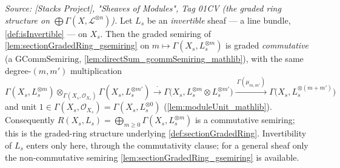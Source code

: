 \begin{lemma}\leanok
  \label{lem:sectionGradedRing_gcommSemiring}
  \textit{Source: [Stacks Project], "Sheaves of Modules", Tag 01CV (the graded
  ring structure on \(\bigoplus \Gamma(X,\mathcal{L}^{\otimes n})\)).}
  Let \(L_s\) be an \emph{invertible} sheaf --- a line bundle,
  \cref{def:isInvertible} --- on \(X_s\). Then the graded semiring of
  \cref{lem:sectionGradedRing_gsemiring} on
  \(m \mapsto \Gamma(X_s, L_s^{\otimes m})\) is graded \emph{commutative} (a
  \(\mathrm{GCommSemiring}\), \cref{lem:directSum_gcommSemiring_mathlib}), with the
  same degree-\((m,m')\) multiplication
  \[
    \Gamma(X_s, L_s^{\otimes m}) \otimes_{\Gamma(X_s,\mathcal{O}_{X_s})}
      \Gamma(X_s, L_s^{\otimes m'})
    \xrightarrow{\ \cdot\ }
    \Gamma\bigl(X_s, L_s^{\otimes m} \otimes L_s^{\otimes m'}\bigr)
    \xrightarrow{\ \Gamma(\mu_{m,m'})\ }
    \Gamma\bigl(X_s, L_s^{\otimes (m+m')}\bigr)
  \]
  and unit \(1 \in \Gamma(X_s, \mathcal{O}_{X_s}) = \Gamma(X_s, L_s^{\otimes 0})\)
  (\cref{lem:moduleUnit_mathlib}). Consequently
  \(R(X_s, L_s) = \bigoplus_{m \ge 0} \Gamma(X_s, L_s^{\otimes m})\) is a
  commutative semiring; this is the graded-ring structure underlying
  \cref{def:sectionGradedRing}. Invertibility of \(L_s\) enters only here, through
  the commutativity clause; for a general sheaf only the non-commutative semiring
  \cref{lem:sectionGradedRing_gsemiring} is available.
\end{lemma}

